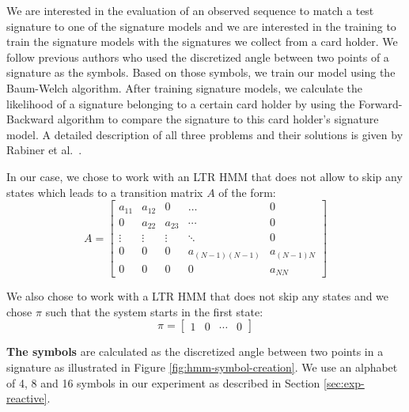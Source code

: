 \documentclass[a4paper, oneside]{csthesis}
\begin{document}
We are interested in the evaluation of an observed sequence to match a test signature to one of the signature models and we are interested in the training to train the signature models with the signatures we collect from a card holder. We follow previous authors who used the discretized angle between two points of a signature as the symbols. Based on those symbols, we train our model using the Baum-Welch algorithm. After training signature models, we calculate the likelihood of a signature belonging to a certain card holder by using the Forward-Backward algorithm to compare the signature to this card holder's signature model. A detailed description of all three problems and their solutions is given by Rabiner et al.~\cite{rabiner1989tutorial}.

In our case, we chose to work with an LTR HMM that does not allow to skip any states which leads to a transition matrix $A$ of the form:
\begin{equation}
A = \left[\begin{array}{ccccc}a_{11} & a_{12} & 0 & \hdots & 0 \\0 & a_{22} & a_{23} & \cdots & 0 \\\vdots & \vdots & \vdots & \ddots & 0 \\0 & 0 & 0 & a_{(N-1)(N-1)} & a_{(N-1)N} \\0 & 0 & 0 & 0 & a_{NN}\end{array}\right]
\label{eq:hmm-transition-matrix}
\end{equation}


We also chose to work with a LTR HMM that does not skip any states and we chose $\pi$ such that the system starts in the first state:
$$\pi = \left[\begin{array}{cccc}1 & 0 & \cdots & 0\end{array}\right]$$


\textbf{The symbols} are calculated as the discretized angle between two points in a signature as illustrated in Figure \ref{fig:hmm-symbol-creation}. We use an alphabet of 4, 8 and 16 symbols in our experiment as described in Section \ref{sec:exp-reactive}.
\end{document}

